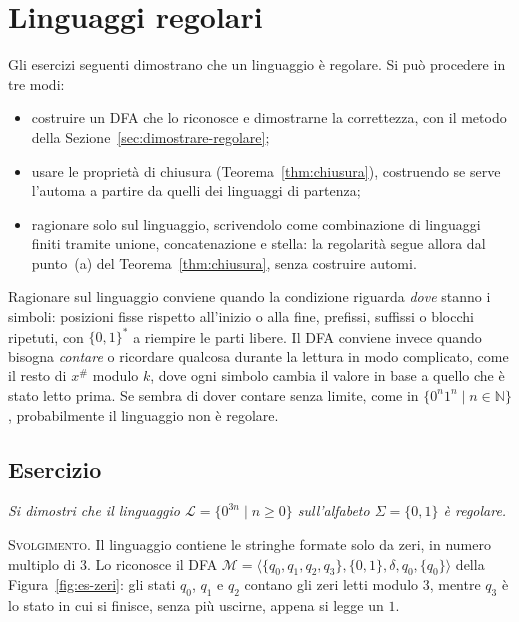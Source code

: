 \documentclass[a4paper, 11pt, oneside]{book}
\makeatletter
\theoremstyle{formale}
\newcommand{\spaziominimo}[1]{%
    \par
    \if@nobreak\else
        \ifdim\pagegoal<\maxdimen
            \ifdim\dimexpr\pagegoal-\pagetotal\relax<#1\relax
                \ifdim\pagetotal>\pagegoal\else
                    \newpage
                \fi
            \fi
        \fi
    \fi}
\newcounter{escount}[section]
\newcommand{\esercizio}{
    \spaziominimo{8\baselineskip}%
    \refstepcounter{escount}%
    \subsection*{Esercizio \arabic{escount}}%
}
\makeatother
\begin{document}
    \section{Linguaggi regolari}
    \label{sec:es-reg}
    Gli esercizi seguenti dimostrano che un linguaggio \`e regolare. Si pu\`o procedere in
    tre modi:
    \begin{itemize}
        \item costruire un DFA che lo riconosce e dimostrarne la correttezza, con il
            metodo della Sezione~\ref{sec:dimostrare-regolare};
        \item usare le propriet\`a di chiusura (Teorema~\ref{thm:chiusura}), costruendo
            se serve l'automa a partire da quelli dei linguaggi di partenza;
        \item ragionare solo sul linguaggio, scrivendolo come combinazione di linguaggi
            finiti tramite unione, concatenazione e stella: la regolarit\`a segue allora
            dal punto~(a) del Teorema~\ref{thm:chiusura}, senza costruire automi.
    \end{itemize}
    Ragionare sul linguaggio conviene quando la condizione riguarda \emph{dove} stanno i
    simboli: posizioni fisse rispetto all'inizio o alla fine, prefissi, suffissi o blocchi
    ripetuti, con $\{0, 1\}^*$ a riempire le parti libere. Il DFA conviene invece quando
    bisogna \emph{contare} o ricordare qualcosa durante la lettura in modo complicato, come
    il resto di $x^\#$ modulo $k$, dove ogni simbolo cambia il valore in base a quello che
    \`e stato letto prima. Se sembra di dover contare senza limite, come in
    $\{0^n 1^n \mid n \in \mathbb{N}\}$, probabilmente il linguaggio non \`e regolare.

    \esercizio
    \textit{Si dimostri che il linguaggio $\mathcal{L} = \{0^{3n} \mid n \geq 0\}$
    sull'alfabeto $\Sigma = \{0, 1\}$ \`e regolare.}

    \textsc{Svolgimento}. Il linguaggio contiene le stringhe formate solo da zeri, in numero
    multiplo di $3$. Lo riconosce il DFA
    $\mathcal{M} = \langle \{q_0, q_1, q_2, q_3\}, \{0, 1\}, \delta, q_0, \{q_0\} \rangle$
    della Figura~\ref{fig:es-zeri}: gli stati $q_0$, $q_1$ e $q_2$ contano gli zeri letti
    modulo $3$, mentre $q_3$ \`e lo stato in cui si finisce, senza pi\`u uscirne, appena si
    legge un $1$.
\end{document}
